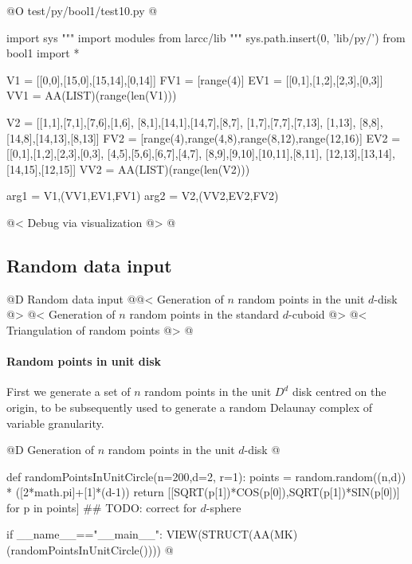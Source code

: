 \documentclass[11pt,oneside]{article}	%
\begin{document}
@O test/py/bool1/test10.py
@{
import sys
""" import modules from larcc/lib """
sys.path.insert(0, 'lib/py/')
from bool1 import *

V1 = [[0,0],[15,0],[15,14],[0,14]]
FV1 = [range(4)]
EV1 = [[0,1],[1,2],[2,3],[0,3]]
VV1 = AA(LIST)(range(len(V1)))

V2 = [[1,1],[7,1],[7,6],[1,6], [8,1],[14,1],[14,7],[8,7], [1,7],[7,7],[7,13],
		[1,13], [8,8],[14,8],[14,13],[8,13]]
FV2 = [range(4),range(4,8),range(8,12),range(12,16)]
EV2 = [[0,1],[1,2],[2,3],[0,3], [4,5],[5,6],[6,7],[4,7], [8,9],[9,10],[10,11],[8,11], [12,13],[13,14],[14,15],[12,15]]
VV2 = AA(LIST)(range(len(V2)))

arg1 = V1,(VV1,EV1,FV1)
arg2 = V2,(VV2,EV2,FV2)

@< Debug via visualization @>
@}




\subsection{Random data input} 

@D Random data input 
@{@< Generation of $n$ random points in the unit $d$-disk @>
@< Generation of $n$ random points in the standard $d$-cuboid @>
@< Triangulation of random points @>
@}

\paragraph{Random points in unit disk} 
First we generate a  set of $n$ random points in the unit $D^d$ disk centred on the origin, to be subsequently used to generate a random Delaunay complex of variable granularity.

@D Generation of $n$ random points in the unit $d$-disk 
@{def randomPointsInUnitCircle(n=200,d=2, r=1):
	points = random.random((n,d)) * ([2*math.pi]+[1]*(d-1))
	return [[SQRT(p[1])*COS(p[0]),SQRT(p[1])*SIN(p[0])] for p in points]
	## TODO: correct for $d$-sphere

if __name__=="__main__":
	VIEW(STRUCT(AA(MK)(randomPointsInUnitCircle()))) 
@}
\end{document}
